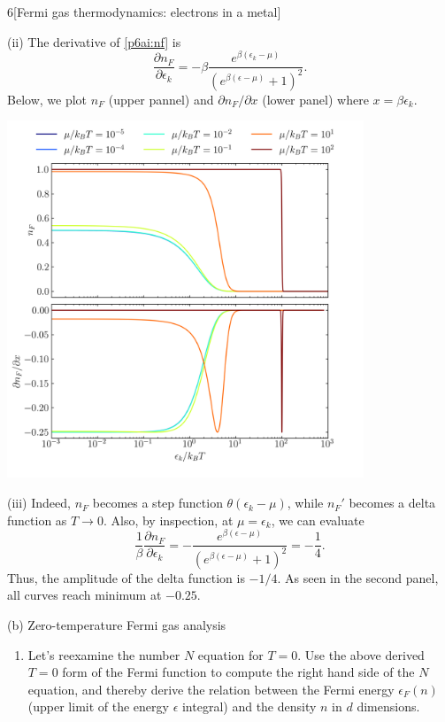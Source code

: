 \documentclass[12pt]{article}
\begin{document}
\begin{problem}{6}[Fermi gas thermodynamics: electrons in a metal]
\begin{solution}
(ii) The derivative of \eqref{p6ai:nf} is
\begin{equation}
    \frac{\partial
    n_F}{\partial\epsilon_k}=-\beta\frac{e^{\beta(\epsilon_k-\mu)}}{(e^{\beta(\epsilon-\mu)}+1)^2}. 
\end{equation}
Below, we plot $n_F$ (upper pannel) and $\partial n_F/\partial x$ (lower panel) where $x=\beta\epsilon_k$.
\begin{center}
    \includegraphics[width=0.8\textwidth]{p6.png} 
\end{center}

(iii) Indeed, $n_F$ becomes a step function $\theta(\epsilon_k-\mu)$, while
$n_F'$ becomes a delta function as $T\to0$. Also, by inspection, at
$\mu=\epsilon_k$, we can evaluate
\begin{equation}
    \frac1\beta\frac{\partial
    n_F}{\partial\epsilon_k}=-\frac{e^{\beta(\epsilon-\mu)}}{(e^{\beta(\epsilon-\mu)}+1)^2}=-\frac14. 
\end{equation}
Thus, the amplitude of the delta function is $-1/4$. As seen in the second
panel, all curves reach minimum at $-0.25$.
\end{solution}

(b) Zero-temperature Fermi gas analysis
\begin{enumerate}[label=(\roman*)]
    \item Let's reexamine the number $N$ equation for $T=0$. Use the above
        derived $T=0$ form of the Fermi function to compute the right hand side
        of the $N$ equation, and thereby derive the relation between the Fermi
        energy $\epsilon_F(n)$ (upper limit of the energy $\epsilon$ integral)
        and the density $n$ in $d$ dimensions.


\end{enumerate}
\end{problem}
\end{document}
